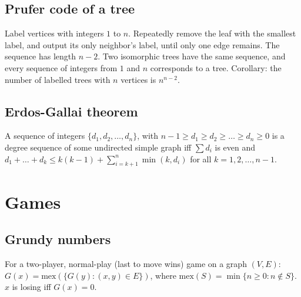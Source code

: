 \documentclass[12pt]{extarticle}
\begin{document}
\begin{multicols*}{2}

\subsection{Prufer code of a tree}
Label vertices with integers $1$ to $n$.
Repeatedly remove the leaf with the smallest label, and output its only
neighbor's label, until only one edge remains. The sequence has
length $n-2$.  Two isomorphic trees have the same sequence, and every sequence
of integers from $1$ and $n$ corresponds to a tree.
Corollary: the number of labelled trees with $n$ vertices is $n^{n-2}$.  %

\subsection{Erdos-Gallai theorem}
A sequence of integers $\{ d_1, d_2, \dots, d_n \}$,
with $n-1 \ge d_1 \ge d_2 \ge \dots \ge d_n \ge 0$ is a degree sequence
of some undirected simple graph iff $\sum d_i$ is even and
$d_1 + \dots + d_k \le k(k-1) + \sum_{i=k+1}^n \min(k, d_{i})$
for all $k=1,2,\dots,n-1$.



\section{Games}

\subsection{Grundy numbers}
For a two-player, normal-play (last to move wins) game on a graph $(V,E)$:
$G(x) = \mbox{mex}(\{ G(y) : (x, y) \in E \})$,
where $\mbox{mex}(S) = \min \{ n \ge 0: n \not\in S \}$.
$x$ is losing iff $G(x) = 0$.


\end{multicols*}
\end{document}
